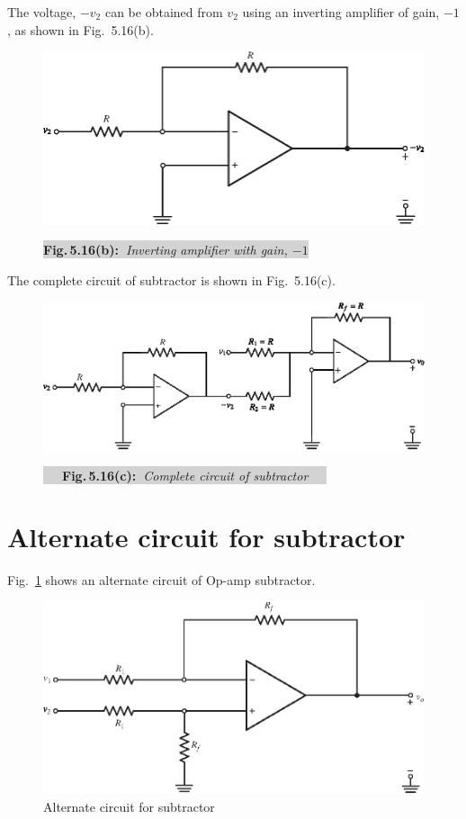 The voltage, $-v_{2}$ can be obtained from $v_{2}$ using an inverting amplifier of gain, $-1$, as shown in Fig.~5.16(b).
\begin{figure}[H]
\centering
\includegraphics{chap4/fig4.14b.eps}

\medskip
\centerline{\colorbox{lightgray}{{\bf Fig.\,5.16(b):~}{\em Inverting amplifier with gain, $-1$}}}
\end{figure}

The complete circuit of subtractor is shown in Fig.~5.16(c).
\begin{figure}[H]
\centering
\includegraphics{chap4/fig4.14c.eps}

\medskip
\centerline{\colorbox{lightgray}{~~~{\bf Fig.\,5.16(c):~}{\em Complete circuit of subtractor}~~~}}
\end{figure}

\section{Alternate circuit for subtractor}\label{sec5.15}

Fig.~\ref{fig5.16} shows an alternate circuit of Op-amp subtractor.
\setcounter{figure}{16}
\begin{figure}[H]
\centering
\includegraphics{chap4/fig4.15.eps}
\caption{Alternate circuit for subtractor}\label{fig5.16}
\end{figure}

